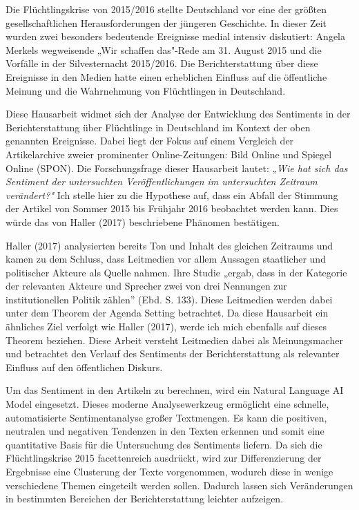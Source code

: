 \documentclass[
  11pt,
]{article}
\begin{document}
Die Flüchtlingskrise von 2015/2016 stellte Deutschland vor eine der
größten gesellschaftlichen Herausforderungen der jüngeren Geschichte. In
dieser Zeit wurden zwei besonders bedeutende Ereignisse medial intensiv
diskutiert: Angela Merkels wegweisende „Wir schaffen das"-Rede am 31.
August 2015 und die Vorfälle in der Silvesternacht 2015/2016. Die
Berichterstattung über diese Ereignisse in den Medien hatte einen
erheblichen Einfluss auf die öffentliche Meinung und die Wahrnehmung von
Flüchtlingen in Deutschland.

Diese Hausarbeit widmet sich der Analyse der Entwicklung des Sentiments
in der Berichterstattung über Flüchtlinge in Deutschland im Kontext der
oben genannten Ereignisse. Dabei liegt der Fokus auf einem Vergleich der
Artikelarchive zweier prominenter Online-Zeitungen: Bild Online und
Spiegel Online (SPON). Die Forschungsfrage dieser Hausarbeit lautet:
„\emph{Wie hat sich das Sentiment der untersuchten Veröffentlichungen im
untersuchten Zeitraum verändert?"} Ich stelle hier zu die Hypothese auf,
dass ein Abfall der Stimmung der Artikel von Sommer 2015 bis Frühjahr
2016 beobachtet werden kann. Dies würde das von Haller (2017)
beschriebene Phänomen bestätigen.

Haller (2017) analysierten bereits Ton und Inhalt des gleichen Zeitraums
und kamen zu dem Schluss, dass Leitmedien vor allem Aussagen staatlicher
und politischer Akteure als Quelle nahmen. Ihre Studie „ergab, dass in
der Kategorie der relevanten Akteure und Sprecher zwei von drei
Nennungen zur institutionellen Politik zählen'' (Ebd. S. 133). Diese
Leitmedien werden dabei unter dem Theorem der Agenda Setting betrachtet.
Da diese Hausarbeit ein ähnliches Ziel verfolgt wie Haller (2017), werde
ich mich ebenfalls auf dieses Theorem beziehen. Diese Arbeit versteht
Leitmedien dabei als Meinungsmacher und betrachtet den Verlauf des
Sentiments der Berichterstattung als relevanter Einfluss auf den
öffentlichen Diskurs.

Um das Sentiment in den Artikeln zu berechnen, wird ein Natural Language
AI Model eingesetzt. Dieses moderne Analysewerkzeug ermöglicht eine
schnelle, automatisierte Sentimentanalyse großer Textmengen. Es kann die
positiven, neutralen und negativen Tendenzen in den Texten erkennen und
somit eine quantitative Basis für die Untersuchung des Sentiments
liefern. Da sich die Flüchtlingskrise 2015 facettenreich ausdrückt, wird
zur Differenzierung der Ergebnisse eine Clusterung der Texte
vorgenommen, wodurch diese in wenige verschiedene Themen eingeteilt
werden sollen. Dadurch lassen sich Veränderungen in bestimmten Bereichen
der Berichterstattung leichter aufzeigen.
\end{document}

